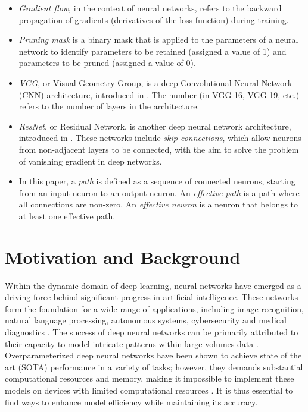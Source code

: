 \begin{itemize}
    \item \textit{Gradient flow}, in the context of neural networks, refers to the backward propagation of gradients (derivatives of the loss function) during training.
    \item \textit{Pruning mask} is a binary mask that is applied to the parameters of a neural network to identify parameters to be retained (assigned a value of 1) and parameters to be pruned (assigned a value of 0).
    \item \textit{VGG}, or Visual Geometry Group, is a deep Convolutional Neural Network (CNN) architecture, introduced in \textcite{simonyan15}. The number (in VGG-16, VGG-19, etc.) refers to the number of layers in the architecture.
    \item \textit{ResNet}, or Residual Network, is another deep neural network architecture, introduced in \textcite{he15}. These networks include \textit{skip connections}, which allow neurons from non-adjacent layers to be connected, with the aim to solve the problem of vanishing gradient in deep networks.
    \item In this paper, a \textit{path} is defined as a sequence of connected neurons, starting from an input neuron to an output neuron. An \textit{effective path} is a path where all connections are non-zero. An \textit{effective neuron} is a neuron that belongs to at least one effective path.

\end{itemize}
\section{Motivation and Background}
Within the dynamic domain of deep learning, neural networks have emerged as a driving force behind significant progress in artificial intelligence. These networks form the foundation for a wide range of applications, including image recognition, natural language processing, autonomous systems, cybersecurity and medical diagnostics \autocite{sarker21}. The success of deep neural networks can be primarily attributed to their capacity to model intricate patterns within large volumes data \autocite{taye23}. Overparameterized deep neural networks have been shown to achieve state of the art (SOTA) performance in a variety of tasks; however, they demands substantial computational resources and memory, making it impossible to implement these models on devices with limited computational resources \autocite{hayou21}. It is thus essential to find ways to enhance model efficiency while maintaining its accuracy.


